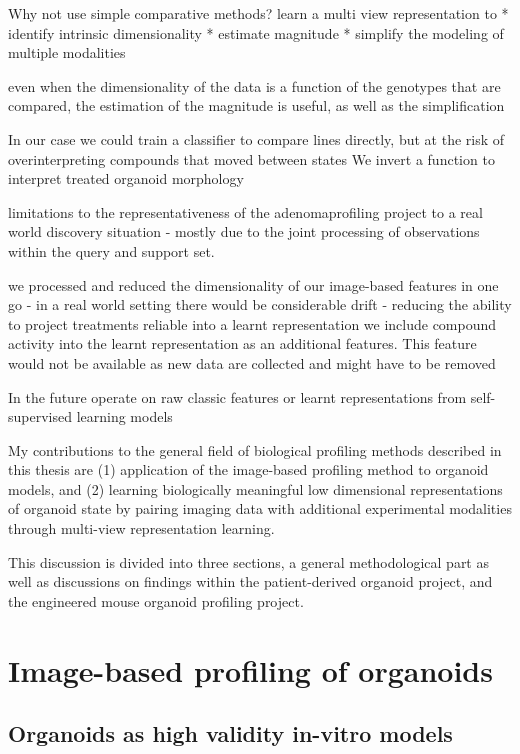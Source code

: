 \begin{flushleft}
Why not use simple comparative methods? 
learn a multi view representation to
* identify intrinsic dimensionality
* estimate magnitude
* simplify the modeling of multiple modalities 

even when the dimensionality of the data is a function of the genotypes that are compared, the estimation of the magnitude is useful, as well as the simplification 

In our case we could train a classifier to compare lines directly, but at the risk of overinterpreting compounds that moved between states
We invert a function to interpret treated organoid morphology

limitations to the representativeness of the adenomaprofiling project to a real world discovery situation - mostly due to the joint processing of observations within the query and support set. 

we processed and reduced the dimensionality of our image-based features in one go - in a real world setting there would be considerable drift - reducing the ability to project treatments reliable into a learnt representation
we include compound activity into the learnt representation as an additional features. This feature would not be available as new data are collected and might have to be removed

In the future operate on raw classic features or learnt representations from self-supervised learning models





My contributions to the general field of biological profiling methods described in this thesis are (1) application of the image-based profiling method to organoid models, and (2) learning biologically meaningful low dimensional representations of organoid state by pairing imaging data with additional experimental modalities through multi-view representation learning. 
\bigbreak

This discussion is divided into three sections, a general methodological part as well as discussions on findings within the patient-derived organoid project, and the engineered mouse organoid profiling project.


\section{Image-based profiling of organoids}

\subsection{Organoids as high validity in-vitro models}


\end{flushleft}
